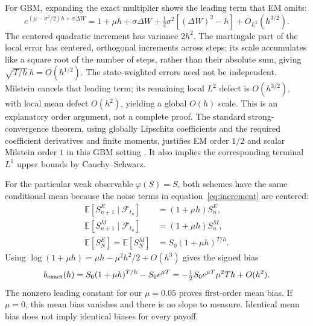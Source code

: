 \documentclass[11pt,a4paper]{article}
\begin{document}
For GBM, expanding the exact multiplier shows the leading term that EM omits:
\begin{equation}\label{eq:local-expansion}
e^{(\mu-\sigma^2/2)h+\sigma\Delta W}
=1+\mu h+\sigma\Delta W+\tfrac12\sigma^2[(\Delta W)^2-h]
+O_{L^2}(h^{3/2}).
\end{equation}
The centered quadratic increment has variance $2h^2$. The martingale part of the local error has centered, orthogonal increments across steps: its scale accumulates like a square root of the number of steps, rather than their absolute sum, giving $\sqrt{T/h}\,h=O(h^{1/2})$. The state-weighted errors need not be independent. Milstein cancels that leading term; its remaining local $L^2$ defect is $O(h^{3/2})$, with local mean defect $O(h^2)$, yielding a global $O(h)$ scale. This is an explanatory order argument, not a complete proof. The standard strong-convergence theorem, using globally Lipschitz coefficients and the required coefficient derivatives and finite moments, justifies EM order $1/2$ and scalar Milstein order $1$ in this GBM setting \cite{higham,kloeden}. It also implies the corresponding terminal $L^1$ upper bounds by Cauchy--Schwarz.

For the particular weak observable $\varphi(S)=S$, both schemes have the same conditional mean because the noise terms in equation~\eqref{eq:increment} are centered:
\begin{align}
\mathbb E[S_{n+1}^E\mid\mathcal F_{t_n}]&=(1+\mu h)S_n^E,\label{eq:conditional-em}\\
\mathbb E[S_{n+1}^M\mid\mathcal F_{t_n}]&=(1+\mu h)S_n^M,\label{eq:conditional-mil}\\
\mathbb E[S_N^E]=\mathbb E[S_N^M]&=S_0(1+\mu h)^{T/h}.\label{eq:discrete-mean}
\end{align}
Using $\log(1+\mu h)=\mu h-\mu^2h^2/2+O(h^3)$ gives the signed bias
\begin{equation}\label{eq:weak}
b_{\rm exact}(h)=S_0(1+\mu h)^{T/h}-S_0e^{\mu T}
=-\tfrac12 S_0e^{\mu T}\mu^2Th+O(h^2).
\end{equation}
The nonzero leading constant for our $\mu=0.05$ proves first-order mean bias. If $\mu=0$, this mean bias vanishes and there is no slope to measure. Identical mean bias does not imply identical biases for every payoff.
\end{document}
